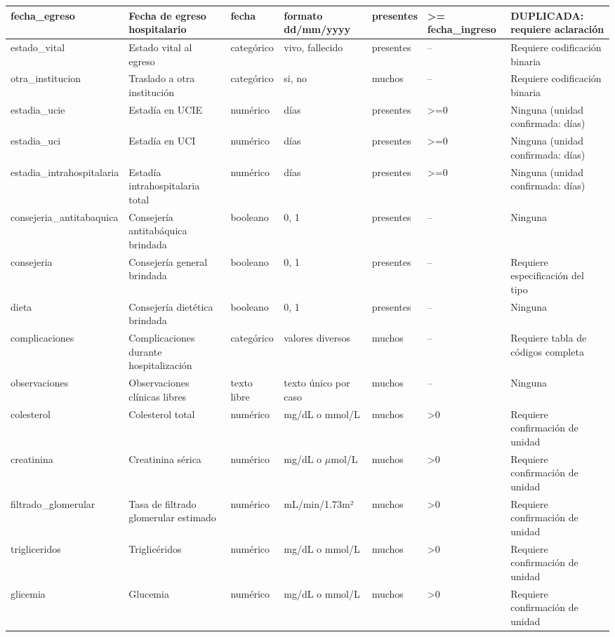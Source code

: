 \documentclass[11pt,a4paper]{article}
\begin{document}
\begin{longtable}{|L{0.095\textwidth}|L{0.17\textwidth}|L{0.07\textwidth}|L{0.16\textwidth}|L{0.14\textwidth}|L{0.13\textwidth}|L{0.15\textwidth}|}
fecha\_egreso & Fecha de egreso hospitalario & fecha & formato dd/mm/yyyy & presentes & >= fecha\_ingreso & \textbf{DUPLICADA}: requiere aclaración \\ \hline
estado\_vital & Estado vital al egreso & categórico & vivo, fallecido & presentes & -- & Requiere codificación binaria \\ \hline
otra\_institucion & Traslado a otra institución & categórico & si, no & muchos & -- & Requiere codificación binaria \\ \hline
estadia\_ucie & Estadía en UCIE & numérico & días & presentes & >=0 & Ninguna (unidad confirmada: días) \\ \hline
estadia\_uci & Estadía en UCI & numérico & días & presentes & >=0 & Ninguna (unidad confirmada: días) \\ \hline
estadia\_intrahospitalaria & Estadía intrahospitalaria total & numérico & días & presentes & >=0 & Ninguna (unidad confirmada: días) \\ \hline
consejeria\_antitabaquica & Consejería antitabáquica brindada & booleano & 0, 1 & presentes & -- & Ninguna \\ \hline
consejeria & Consejería general brindada & booleano & 0, 1 & presentes & -- & Requiere especificación del tipo \\ \hline
dieta & Consejería dietética brindada & booleano & 0, 1 & presentes & -- & Ninguna \\ \hline
complicaciones & Complicaciones durante hospitalización & categórico & valores diversos & muchos & -- & Requiere tabla de códigos completa \\ \hline
observaciones & Observaciones clínicas libres & texto libre & texto único por caso & muchos & -- & Ninguna \\ \hline
colesterol & Colesterol total & numérico & mg/dL o mmol/L & muchos & >0 & Requiere confirmación de unidad \\ \hline
creatinina & Creatinina sérica & numérico & mg/dL o $\mu$mol/L & muchos & >0 & Requiere confirmación de unidad \\ \hline
filtrado\_glomerular & Tasa de filtrado glomerular estimado & numérico & mL/min/1.73m² & muchos & >0 & Requiere confirmación de unidad \\ \hline
trigliceridos & Triglicéridos & numérico & mg/dL o mmol/L & muchos & >0 & Requiere confirmación de unidad \\ \hline
glicemia & Glucemia & numérico & mg/dL o mmol/L & muchos & >0 & Requiere confirmación de unidad \\ \hline

\end{longtable}
\end{document}
